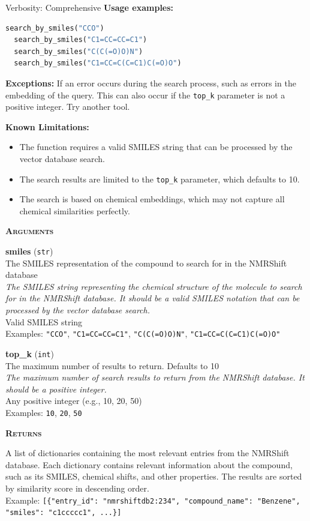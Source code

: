\begin{hypobox}{Verbosity: Comprehensive}
    \textbf{Usage examples:}
    \begin{lstlisting}[language=Python, basicstyle=\ttfamily\small]
  search_by_smiles("CCO")
  search_by_smiles("C1=CC=CC=C1")
  search_by_smiles("C(C(=O)O)N")
  search_by_smiles("C1=CC=C(C=C1)C(=O)O")
    \end{lstlisting}

    \textbf{Exceptions:} If an error occurs during the search process, such as errors in the embedding of the query. This can also occur if the \texttt{top\_k} parameter is not a positive
  integer. Try another tool.

    \textbf{Known Limitations:}
    \begin{itemize}[nosep]
      \item The function requires a valid SMILES string that can be processed by the vector database search.
      \item The search results are limited to the \texttt{top\_k} parameter, which defaults to 10.
      \item The search is based on chemical embeddings, which may not capture all chemical similarities perfectly.
    \end{itemize}

    \medskip
    \textbf{\textsc{Arguments}}

    \textbf{smiles} (\texttt{str})\\
    \quad The SMILES representation of the compound to search for in the NMRShift database\\
    \quad \textit{The SMILES string representing the chemical structure of the molecule to search for in the NMRShift database. It should be a valid SMILES notation that can be processed
  by the vector database search.}\\
    \quad Valid SMILES string\\
    \quad Examples: \texttt{"CCO"}, \texttt{"C1=CC=CC=C1"}, \texttt{"C(C(=O)O)N"}, \texttt{"C1=CC=C(C=C1)C(=O)O"}

    \textbf{top\_k} (\texttt{int})\\
    \quad The maximum number of results to return. Defaults to 10\\
    \quad \textit{The maximum number of search results to return from the NMRShift database. It should be a positive integer.}\\
    \quad Any positive integer (e.g., 10, 20, 50)\\
    \quad Examples: \texttt{10}, \texttt{20}, \texttt{50}

    \medskip
    \textbf{\textsc{Returns}}

    \quad A list of dictionaries containing the most relevant entries from the NMRShift database. Each dictionary contains relevant information about the compound, such as its SMILES,
  chemical shifts, and other properties. The results are sorted by similarity score in descending order.\\
    \quad Example: \texttt{[\{"entry\_id": "nmrshiftdb2:234", "compound\_name": "Benzene", "smiles": "c1ccccc1", ...\}]}
  \end{hypobox}

